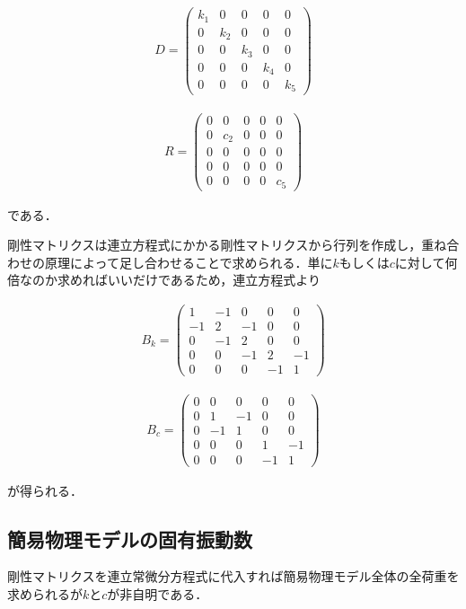 \begin{eqnarray}
    D =
    \left(\begin{matrix}
        k_1 & 0   & 0   & 0   & 0    \\
        0   & k_2 & 0   & 0   & 0    \\
        0   & 0   & k_3 & 0   & 0    \\
        0   & 0   & 0   & k_4 & 0    \\
        0   & 0   & 0   & 0   & k_5 
    \end{matrix}\right)
\end{eqnarray}

\begin{eqnarray}
    R = 
    \left(\begin{matrix}
        0   & 0   & 0   & 0   & 0   \\
        0   & c_2 & 0   & 0   & 0   \\
        0   & 0   & 0   & 0   & 0   \\
        0   & 0   & 0   & 0   & 0   \\
        0   & 0   & 0   & 0   & c_5 
    \end{matrix}\right)
\end{eqnarray}

である．

剛性マトリクスは連立方程式にかかる剛性マトリクスから行列を作成し，重ね合わせの原理によって足し合わせることで求められる．単に$k$もしくは$c$に対して何倍なのか求めればいいだけであるため，連立方程式より

\begin{eqnarray}
    B_k = 
    \left(\begin{matrix}
        1   & -1  & 0   & 0   & 0  \\
        -1  & 2   & -1  & 0   & 0  \\
        0   & -1  & 2   & 0   & 0  \\
        0   & 0   & -1  & 2   & -1 \\
        0   & 0   & 0   & -1  & 1
    \end{matrix}\right)
\end{eqnarray}

\begin{eqnarray}
    B_c = 
    \left(\begin{matrix}
        0   & 0   & 0   & 0   & 0   \\
        0   & 1   & -1  & 0   & 0   \\
        0   & -1  & 1   & 0   & 0   \\
        0   & 0   & 0   & 1   & -1  \\
        0   & 0   & 0   & -1  & 1
    \end{matrix}\right)
\end{eqnarray}

が得られる．

\subsection{簡易物理モデルの固有振動数}

剛性マトリクスを連立常微分方程式に代入すれば簡易物理モデル全体の全荷重を求められるが$k$と$c$が非自明である．

